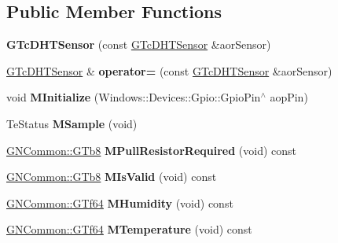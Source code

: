 \subsection*{Public Member Functions}
\begin{DoxyCompactItemize}
\item 
\mbox{\label{class_console_1_1_g_tc_d_h_t_sensor_a28a32f003a0916d1009564d0dedf75de}} 
{\bfseries G\+Tc\+D\+H\+T\+Sensor} (const \mbox{\hyperlink{class_console_1_1_g_tc_d_h_t_sensor}{G\+Tc\+D\+H\+T\+Sensor}} \&aor\+Sensor)
\item 
\mbox{\label{class_console_1_1_g_tc_d_h_t_sensor_a42e5b9edaea5dcfc2c914a25ba41b1ef}} 
\mbox{\hyperlink{class_console_1_1_g_tc_d_h_t_sensor}{G\+Tc\+D\+H\+T\+Sensor}} \& {\bfseries operator=} (const \mbox{\hyperlink{class_console_1_1_g_tc_d_h_t_sensor}{G\+Tc\+D\+H\+T\+Sensor}} \&aor\+Sensor)
\item 
\mbox{\label{class_console_1_1_g_tc_d_h_t_sensor_a66a5d9d2f43f1a42dce542181d98acb5}} 
void {\bfseries M\+Initialize} (Windows\+::\+Devices\+::\+Gpio\+::\+Gpio\+Pin$^\wedge$ aop\+Pin)
\item 
\mbox{\label{class_console_1_1_g_tc_d_h_t_sensor_af433fb954e3f8c8b5ed2c794d1be2563}} 
Te\+Status {\bfseries M\+Sample} (void)
\item 
\mbox{\label{class_console_1_1_g_tc_d_h_t_sensor_a6a29ed7188a817c4e35a8d87ee34d65c}} 
\mbox{\hyperlink{namespace_g_n_common_a6b5283329f609e2175dd0c91fc1520ba}{G\+N\+Common\+::\+G\+Tb8}} {\bfseries M\+Pull\+Resistor\+Required} (void) const
\item 
\mbox{\label{class_console_1_1_g_tc_d_h_t_sensor_aedc75ca476023f30adfc10cf27e431cd}} 
\mbox{\hyperlink{namespace_g_n_common_a6b5283329f609e2175dd0c91fc1520ba}{G\+N\+Common\+::\+G\+Tb8}} {\bfseries M\+Is\+Valid} (void) const
\item 
\mbox{\label{class_console_1_1_g_tc_d_h_t_sensor_a17d7fe7d6cd82e388b48c2653a95077d}} 
\mbox{\hyperlink{namespace_g_n_common_a22b37ff753b3e7a48d9d31addf35a739}{G\+N\+Common\+::\+G\+Tf64}} {\bfseries M\+Humidity} (void) const
\item 
\mbox{\label{class_console_1_1_g_tc_d_h_t_sensor_a717cd7d8fe381f24edcb3fa69436b0fb}} 
\mbox{\hyperlink{namespace_g_n_common_a22b37ff753b3e7a48d9d31addf35a739}{G\+N\+Common\+::\+G\+Tf64}} {\bfseries M\+Temperature} (void) const
\end{DoxyCompactItemize}
